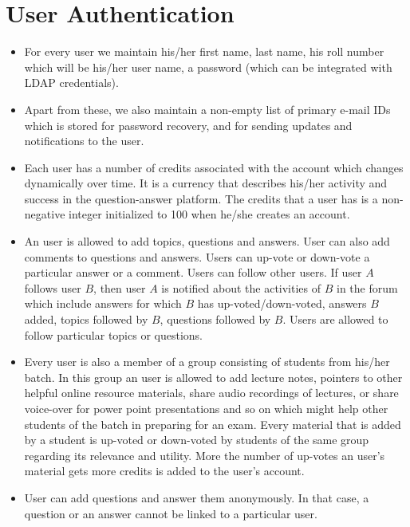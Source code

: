 \documentclass{article}
\begin{document}
\section{User Authentication}
\begin{itemize}
\item For every user we maintain his/her first name, last name, his roll number which will be his/her user name, a password (which can be integrated with LDAP credentials).
\item Apart from these, we also maintain a non-empty list of primary e-mail IDs which is stored for password recovery, and for sending updates and notifications to the user.
\item Each user has a number of credits associated with the account which changes dynamically over time. It is a currency that describes his/her activity and success in the question-answer platform. The credits that a user has is a non-negative integer initialized to 100 when he/she creates an account.
\item An user is allowed to add topics, questions and answers. User can also add comments to questions and answers. Users can up-vote or down-vote a particular answer or a comment. Users can follow other users. If user $A$ follows user $B$, then user $A$ is notified about the activities of $B$ in the forum which include answers for which $B$ has up-voted/down-voted, answers $B$ added, topics followed by $B$, questions followed by $B$. Users are allowed to follow particular topics or questions.
\item Every user is also a member of a group consisting of students from his/her batch. In this group an user is allowed to add lecture notes, pointers to other helpful online resource materials, share audio recordings of lectures, or share voice-over for power point presentations and so on which might help other students of the batch in preparing for an exam. Every material that is added by a student is up-voted or down-voted by students of the same group regarding its relevance and utility. More the number of up-votes an user's material gets more credits is added to the user's account. 
\item User can add questions and answer them anonymously. In that case, a question or an answer cannot be linked to a particular user.
\end{itemize}
\end{document}
